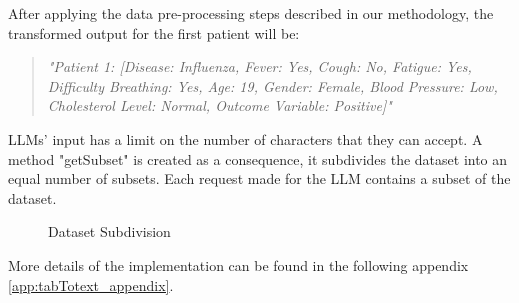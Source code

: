 After applying the data pre-processing steps described in our methodology, the transformed output for the first patient will be:

\begin{quote}
\textit{"Patient 1: [Disease: Influenza, Fever: Yes, Cough: No, Fatigue: Yes, Difficulty Breathing: Yes, Age: 19, Gender: Female, Blood Pressure: Low, Cholesterol Level: Normal, Outcome Variable: Positive]"}
\end{quote}

\vspace{0.5cm}

LLMs' input has a limit on the number of characters that they can accept. A method "getSubset" is created as a consequence, it subdivides the dataset into an equal number of subsets. 
Each request made for the LLM contains a subset of the dataset.

\begin{figure}[H]
    \centering
    \caption{Dataset Subdivision}
    \label{fig:dataset_subdivision}
\end{figure}

More details of the implementation can be found in the following appendix \ref{app:tabTotext_appendix}.



